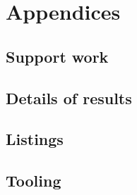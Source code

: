 \documentclass[
  oneside,
  11pt, a4paper,
  footinclude=true,
  headinclude=true,
  cleardoublepage=empty
]{scrbook}
\begin{document}

\printindex
	
	\appendix
	\renewcommand\chaptername{Appendix}


\part{Appendices}

\chapter{Support work}

\chapter{Details of results}

\chapter{Listings}

\chapter{Tooling}

	
\begin{backcover}
\thispagestyle{empty} \pagecolor{white} \textcolor{black} {\selectfont ~\vfill
\noindent
%
\vfill ~}
\end{backcover}
\end{document}
